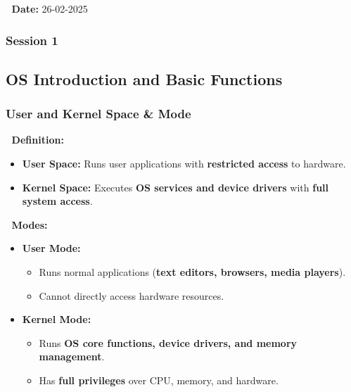 \documentclass[
]{article}
\providecommand{\tightlist}{%
  \setlength{\itemsep}{0pt}\setlength{\parskip}{0pt}}
\begin{document}
📅 \textbf{Date:} 26-02-2025

\subsubsection{Session 1}\label{session-1}

\subsection{\texorpdfstring{\textbf{OS Introduction and Basic
Functions}}{OS Introduction and Basic Functions}}\label{os-introduction-and-basic-functions}

\subsubsection{\texorpdfstring{\textbf{User and Kernel Space \&
Mode}}{User and Kernel Space \& Mode}}\label{user-and-kernel-space-mode}

📌 \textbf{Definition:}

\begin{itemize}
\tightlist
\item
  \textbf{User Space:} Runs user applications with \textbf{restricted
  access} to hardware.
\item
  \textbf{Kernel Space:} Executes \textbf{OS services and device
  drivers} with \textbf{full system access}.
\end{itemize}

📌 \textbf{Modes:}

\begin{itemize}
\tightlist
\item
  \textbf{User Mode:}

  \begin{itemize}
  \tightlist
  \item
    Runs normal applications (\textbf{text editors, browsers, media
    players}).
  \item
    Cannot directly access hardware resources.
  \end{itemize}
\item
  \textbf{Kernel Mode:}

  \begin{itemize}
  \tightlist
  \item
    Runs \textbf{OS core functions, device drivers, and memory
    management}.
  \item
    Has \textbf{full privileges} over CPU, memory, and hardware.
  \end{itemize}
\end{itemize}
\end{document}
